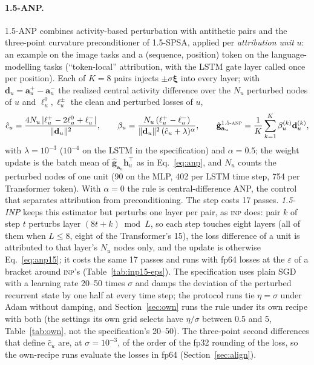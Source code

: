 \documentclass{article}
\newcommand{\method}[1]{\textsc{#1}}
\newcommand{\ANPb}{\method{1.5-anp}}
\newcommand{\INP}{\method{inp}}
\newcommand{\ghat}{\hat{\mathbf{g}}}
\newcommand{\bxi}{\boldsymbol{\xi}}
\newcommand{\bd}{\mathbf{d}}
\newcommand{\bh}{\mathbf{h}}
\newcommand{\ba}{\mathbf{a}}
\begin{document}
\paragraph{1.5-ANP.}
1.5-ANP \citep{chaubard2025anp15} combines activity-based perturbation with antithetic
pairs and the three-point curvature preconditioner of 1.5-SPSA, applied per
\emph{attribution unit} $u$: an example on the image tasks and a (sequence, position)
token on the language-modelling tasks (``token-local'' attribution, with the LSTM gate
layer called once per position). Each of $K=8$ pairs injects $\pm\sigma\bxi$ into every
layer; with $\bd_u=\ba_u^{+}-\ba_u^{-}$ the realized central activity difference over
the $N_u$ perturbed nodes of $u$ and $\ell_u^{0},\ell_u^{\pm}$ the clean and perturbed
losses of $u$,
\begin{equation}
  \hat c_u=\frac{4N_u\,|\ell_u^{+}-2\ell_u^{0}+\ell_u^{-}|}{\|\bd_u\|^{2}},\qquad
  \beta_u=\frac{N_u\,(\ell_u^{+}-\ell_u^{-})}{\|\bd_u\|^{2}\,(\hat c_u+\lambda)^{\alpha}},\qquad
  \ghat_{\ba_u}^{\ANPb}=\frac{1}{K}\sum_{k=1}^{K}\beta_u^{(k)}\bd_u^{(k)},
  \label{eq:anp15}
\end{equation}
with $\lambda=10^{-3}$ ($10^{-4}$ on the LSTM in the specification) and $\alpha=0.5$;
the weight update is the batch mean of $\ghat_{\ba_u}\bh_u^{\top}$ as in
Eq.~\eqref{eq:anp}, and $N_u$ counts the perturbed nodes of one unit (90 on the MLP, 402
per LSTM time step, 754 per Transformer token). With $\alpha=0$ the rule is
central-difference ANP, the control that separates attribution from preconditioning.
The step costs 17 passes. \emph{1.5-INP} keeps this estimator but perturbs one layer per
pair, as \INP{} does: pair $k$ of step $t$ perturbs layer $(8t+k)\bmod L$, so each step
touches eight layers (all of them when $L\le8$, eight of the Transformer's 15), the
loss difference of a unit is attributed to that layer's $N_u$ nodes only, and the
update is otherwise Eq.~\eqref{eq:anp15}; it costs the same 17 passes and runs with fp64
losses at the $\varepsilon$ of a bracket around \INP{}'s (Table~\ref{tab:inp15-eps}). The specification uses plain SGD with a learning rate 20--50
times $\sigma$ and damps the deviation of the perturbed recurrent state by one half at
every time step; the protocol runs tie $\eta=\sigma$ under Adam without damping, and
Section~\ref{sec:own} runs the rule under its own recipe with both (the settings its
own grid selects have $\eta/\sigma$ between 0.5 and 5, Table~\ref{tab:own}, not the
specification's 20--50). The three-point
second differences that define $\hat c_u$ are, at $\sigma=10^{-3}$, of the order of the
fp32 rounding of the loss, so the own-recipe runs evaluate the losses in fp64
(Section~\ref{sec:align}).
\end{document}
